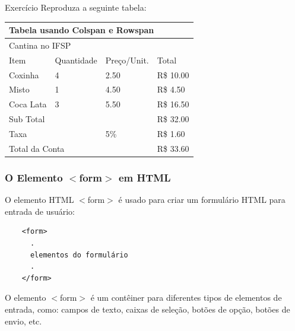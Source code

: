 \documentclass{beamer}
\begin{document}
\begin{frame}{Exercício}
Reproduza a seguinte tabela:
\begin{table}[]
\begin{tabular}{|llll|}
\hline
\multicolumn{4}{|l|}{Tabela usando Colspan e Rowspan}                                                            \\ \hline
\multicolumn{4}{|l|}{Cantina no IFSP}                                                                            \\ \hline
\multicolumn{1}{|l|}{Item}      & \multicolumn{1}{l|}{Quantidade} & \multicolumn{1}{l|}{Preço/Unit.} & Total     \\ \hline
\multicolumn{1}{|l|}{Coxinha}   & \multicolumn{1}{l|}{4}          & \multicolumn{1}{l|}{2.50}        & R\$ 10.00 \\ \hline
\multicolumn{1}{|l|}{Misto}     & \multicolumn{1}{l|}{1}          & \multicolumn{1}{l|}{4.50}        & R\$ 4.50  \\ \hline
\multicolumn{1}{|l|}{Coca Lata} & \multicolumn{1}{l|}{3}          & \multicolumn{1}{l|}{5.50}        & R\$ 16.50 \\ \hline
\multicolumn{3}{|l|}{Sub Total}                                                                      & R\$ 32.00 \\ \hline
\multicolumn{2}{|l|}{Taxa}                                        & \multicolumn{1}{l|}{5\%}         & R\$ 1.60  \\ \hline
\multicolumn{3}{|l|}{Total da Conta}                                                                 & R\$ 33.60 \\ \hline
\end{tabular}
\end{table}
\end{frame}

\begin{frame}[fragile]
  \frametitle{O Elemento \(<\)form\(>\) em HTML}

  O elemento HTML \(<\)form\(>\) é usado para criar um formulário HTML para entrada de usuário:

  \begin{center}
    \begin{verbatim}
    <form>
      .
      elementos do formulário
      .
    </form>
    \end{verbatim}
  \end{center}

  O elemento \(<\)form\(>\) é um contêiner para diferentes tipos de elementos de entrada, como: campos de texto, caixas de seleção, botões de opção, botões de envio, etc.
\end{frame}
\end{document}
